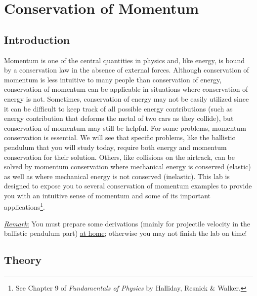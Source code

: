 \chapter{Conservation of Momentum}
\label{chap:conservationofmomentum}
{}
\makeatletter
\newcommand{\enumeratext}[1]{%
\setcounter{saveenumerate}{\value{enum\romannumeral\the\@enumdepth}}
\end{enumerate}
#1
\begin{enumerate}
\setcounter{enum\romannumeral\the\@enumdepth}{\value{saveenumerate}}%
}
\makeatother

\section{Introduction}

Momentum is one of the central quantities in physics and, like energy, is bound by a conservation law in the absence of external forces. Although conservation of momentum is less intuitive to many people than conservation of energy, conservation of momentum can be applicable in situations where conservation of energy is not. Sometimes, conservation of energy may not be easily utilized since it can be difficult to keep track of all possible energy contributions (such as energy contribution that deforms the metal of two cars as they collide), but conservation of momentum may still be helpful. For some problems, momentum conservation is essential. We will see that specific problems, like the ballistic pendulum that you will study today, require both energy and momentum conservation for their solution. Others, like collisions on the airtrack, can be solved by momentum conservation where mechanical energy is conserved (elastic) as well as where mechanical energy is not conserved (inelastic). This lab is designed to expose you to several conservation of momentum examples to provide you with an intuitive sense of momentum and some of its important applications\footnote{See Chapter 9 of \emph{Fundamentals of Physics} by Halliday, Resnick \& Walker.}.\myskip

\underline{\emph{Remark}:} You must prepare some derivations (mainly for projectile velocity in the ballistic pendulum part) \underline{at home}; otherwise you may not finish the lab on time!

\section{Theory}
